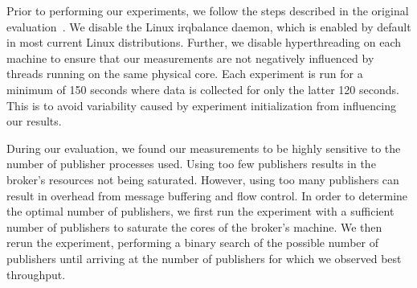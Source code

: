 \documentclass[letterpaper,twocolumn,10pt]{article}
\begin{document}

Prior to performing our experiments, we follow the steps described in the original evaluation~\cite{Rocketbufs,hoang2019building}.
We disable the Linux irqbalance daemon, which is enabled by default in most current Linux distributions.
Further, we disable hyperthreading on each machine to ensure that our measurements are not negatively influenced by threads running on the same physical core.
Each experiment is run for a minimum of 150 seconds where data is collected for only the latter 120 seconds.
This is to avoid variability caused by experiment initialization from influencing our results.


During our evaluation, we found our measurements to be highly sensitive to the number of publisher processes used.
Using too few publishers results in the broker's resources not being saturated. However, using too many publishers can result in overhead from message buffering and flow control.
In order to determine the optimal number of publishers, we first run the experiment with a sufficient number of publishers to saturate the cores of the broker's machine.
We then rerun the experiment, performing a binary search of the possible number of publishers until arriving at the number of publishers for which we observed best throughput.
\end{document}
